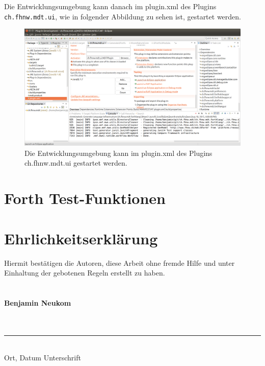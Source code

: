 \documentclass[listof=totocnumbered,bibliography=totocnumbered]{scrreprt}
\numberwithin{equation}{subsection}
\begin{document}
Die Entwicklungsumgebung kann danach im plugin.xml des Plugins \verb!ch.fhnw.mdt.ui!, wie in folgender Abbildung \cite{fig:runide} zu sehen ist, gestartet werden.

\begin{figure}[H]
	\centering
		\includegraphics[scale=0.2]{runide.png}
		\caption{Die Entwicklungsumgebung kann im plugin.xml des Plugins ch.fhnw.mdt.ui gestartet werden.}
		\label{fig:runide}
\end{figure}

\newpage
\chapter{Forth Test-Funktionen}

\newpage
\chapter{Ehrlichkeitserklärung}
Hiermit bestätigen die Autoren, diese Arbeit ohne fremde Hilfe und unter Einhaltung der gebotenen Regeln erstellt zu haben.
\\
\\
\\
\textbf{Benjamin Neukom}
\\
\\
\\
\rule{0.75\textwidth}{0.4pt} \\
Ort, Datum \hspace * {4cm} Unterschrift
\end{document}
